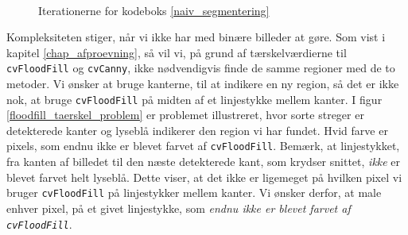 {\begin{figure}[!p]
    \\
    \hspace{1em}
        \caption[]{Iterationerne for kodeboks \ref{naiv_segmentering}}
    \label{region_extract}
\end{figure}

Kompleksiteten stiger, når vi ikke har med binære billeder at gøre. Som
vist i kapitel \ref{chap_afproevning}, så vil vi, på grund af
tærskelværdierne til \texttt{cvFloodFill} og \texttt{cvCanny}, ikke
nødvendigvis finde de samme regioner med de to metoder. Vi ønsker at
bruge kanterne, til at indikere en ny region, så det er ikke nok, at bruge
\texttt{cvFloodFill} på midten af et linjestykke mellem kanter. I figur
\ref{floodfill_taerskel_problem} er problemet illustreret, hvor sorte
streger er detekterede kanter og lyseblå indikerer den region vi har
fundet. Hvid farve er pixels, som endnu ikke er blevet farvet af
\texttt{cvFloodFill}.  Bemærk, at linjestykket, fra kanten af billedet
til den næste detekterede kant, som krydser snittet, \emph{ikke} er
blevet farvet helt lyseblå. Dette viser, at det ikke er ligemeget på
hvilken pixel vi bruger \texttt{cvFloodFill} på linjestykker mellem
kanter. Vi ønsker derfor, at male enhver pixel, på et givet linjestykke,
som \emph{endnu ikke er blevet farvet af \texttt{cvFloodFill}}.

}

